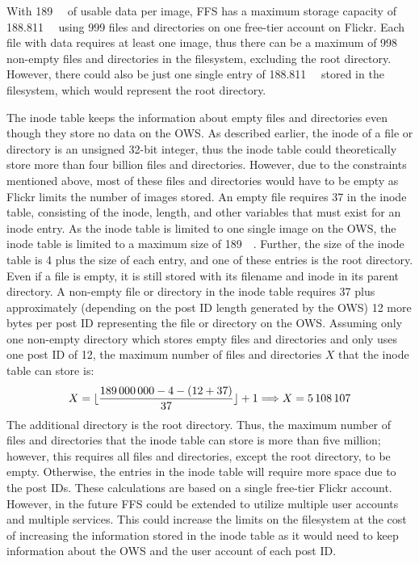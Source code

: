 With \SI{189}{\mega\byte} of usable data per image, \gls{FFS} has a maximum storage capacity of \SI{188.811}{\giga\byte} using 999 files and directories on one \mbox{free-tier} account on Flickr. Each file with data requires at least one image, thus there can be a maximum of 998 \mbox{non-empty} files and directories in the filesystem, excluding the root directory. However, there could also be just one single entry of \SI{188.811}{\giga\byte} stored in the filesystem, which would represent the root directory.

The inode table keeps the information about empty files and directories even though they store no data on the \gls{OWS}. As described earlier, the inode of a file or directory is an unsigned \mbox{32-bit} integer, thus the inode table could theoretically store more than four billion files and directories. However, due to the constraints mentioned above, most of these files and directories would have to be empty as Flickr limits the number of images stored. An empty file requires \SI{37}{\byte} in the inode table, consisting of the inode, length, and other variables that must exist for an inode entry. As the inode table is limited to one single image on the \gls{OWS}, the inode table is limited to a maximum size of \SI{189}{\mega\byte}. Further, the size of the inode table is \SI{4}{\byte} plus the size of each entry, and one of these entries is the root directory. Even if a file is empty, it is still stored with its filename and inode in its parent directory. A \mbox{non-empty} file or directory in the inode table requires \SI{37}{\byte} plus approximately (depending on the post ID length generated by the \gls{OWS}) 12 more bytes per post ID representing the file or directory on the \gls{OWS}. Assuming only one \mbox{non-empty} directory which stores empty files and directories and only uses one post ID of \SI{12}{\byte}, the maximum number of files and directories $X$ that the inode table can store is:
\begin{equation}
	X = \lfloor \frac{\num{189000000} - 4 - (12 + 37)}{37} \rfloor + 1 \Longrightarrow X = \num{5108107}
\end{equation}
The additional directory is the root directory. Thus, the maximum number of files and directories that the inode table can store is more than five million; however, this requires all files and directories, except the root directory, to be empty. Otherwise, the entries in the inode table will require more space due to the post IDs. These calculations are based on a single \mbox{free-tier} Flickr account. However, in the future \gls{FFS} could be extended to utilize multiple user accounts and multiple services. This could increase the limits on the filesystem at the cost of increasing the information stored in the inode table as it would need to keep information about the \gls{OWS} and the user account of each post ID.

